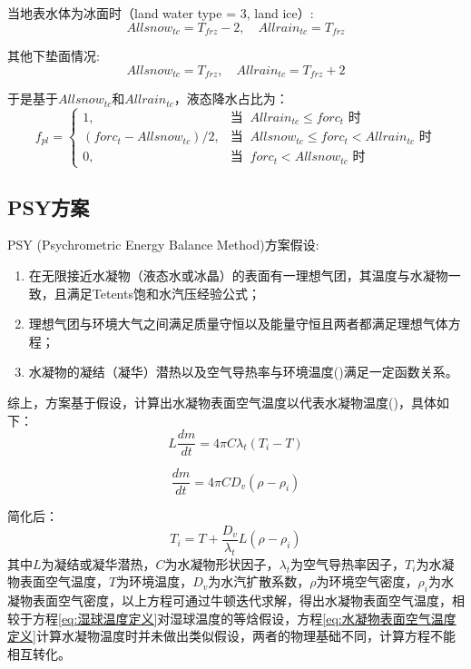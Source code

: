 当地表水体为冰面时（land water type = 3, land ice）:
\begin{equation}
Allsnow_{tc} = T_{frz} - 2,\quad Allrain_{tc} = T_{frz}
\end{equation}

其他下垫面情况:
\begin{equation}
Allsnow_{tc} = T_{frz},\quad Allrain_{tc} = T_{frz} +2
\end{equation}

于是基于$Allsnow_{tc}$和$Allrain_{tc}$，液态降水占比为：
\begin{equation*}
f_{pl}= \begin{cases}
1, & \text{当 }\ Allrain_{tc}\le forc_t \text{ 时}\\
(forc_t - Allsnow_{tc})/2, & \text{当 }\ Allsnow_{tc}\le forc_t < Allrain_{tc} \text{ 时} \\
0, & \text{当 }\ forc_t < Allsnow_{tc} \text{ 时}
\end{cases}
\end{equation*}


\subsection{PSY方案}
PSY (Psychrometric Energy Balance Method)方案假设:
\begin{enumerate}
    \item 在无限接近水凝物（液态水或冰晶）的表面有一理想气团，其温度与水凝物一致，且满足Tetents饱和水汽压经验公式；
    \item 理想气团与环境大气之间满足质量守恒以及能量守恒且两者都满足理想气体方程；
    \item 水凝物的凝结（凝华）潜热以及空气导热率与环境温度(\textcelsius)满足一定函数关系。
\end{enumerate}

综上，方案基于假设，计算出水凝物表面空气温度以代表水凝物温度(\textcelsius)，具体如下：
\begin{equation}
L\frac{dm}{dt}=4\pi C\lambda_t(T_i - T)
\end{equation}

\begin{equation}
\frac{dm}{dt}=4\pi CD_v(\rho - \rho_i)
\end{equation}

简化后：
\begin{equation}
\label{eq:水凝物表面空气温度定义}
T_i = T + \frac{D_v}{\lambda_{t}}L(\rho - \rho_i)
\end{equation}
%
其中$L$为凝结或凝华潜热，$C$为水凝物形状因子，$\lambda_t$为空气导热率因子，$T_i$为水凝物表面空气温度，$T$为环境温度，$D_v$为水汽扩散系数，$\rho$为环境空气密度，$\rho_i$为水凝物表面空气密度，以上方程可通过牛顿迭代求解，得出水凝物表面空气温度，相较于方程\ref{eq:湿球温度定义}对湿球温度的等焓假设，方程\ref{eq:水凝物表面空气温度定义}计算水凝物温度时并未做出类似假设，两者的物理基础不同，计算方程不能相互转化。

